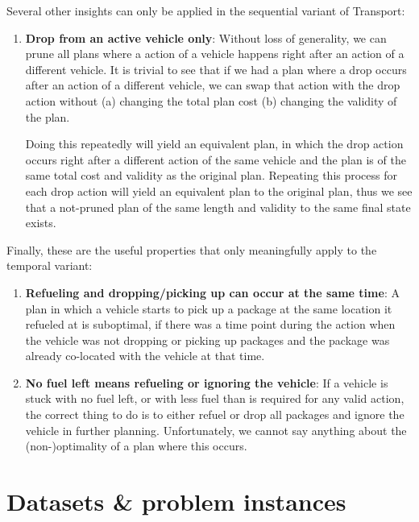 Several other insights can only be applied in the sequential variant of Transport:
\begin{enumerate}
\item \textbf{Drop from an active vehicle only}: Without loss of generality,
we can prune all plans where a \drop{} action of a vehicle happens
right after an action of a different vehicle. It is trivial to see that if we had a plan where a drop
occurs after an action of a different vehicle, we can swap that action with the drop
action without (a) changing the total plan cost (b) changing the validity of the plan.

Doing this repeatedly will yield an equivalent plan, in which the drop action
occurs right after a different action of the same vehicle and the plan is of the same total cost and validity as the original plan. Repeating this process for each drop action will yield an equivalent plan to the original plan, thus we see that a not-pruned plan of the same length and validity to the same final state exists.
\end{enumerate}
Finally, these are the useful properties that only meaningfully apply to the temporal variant:
\begin{enumerate}
\item \textbf{Refueling and dropping/picking up can occur at the same time}: 
A plan in which a vehicle starts to pick up a package at the same location it refueled at is suboptimal, if there was a time point during the  action
when the vehicle was not dropping or picking up packages and the package was already
co-located with the vehicle at that time.

\item \textbf{No fuel left means refueling or ignoring the vehicle}:
If a vehicle is stuck with no fuel left, or with less fuel than is required for
any valid \drive{} action, the correct thing to do is to either refuel or drop
all packages and ignore the vehicle in further planning. Unfortunately,
we cannot say anything about the (non-)optimality of a plan where this occurs.
\end{enumerate}
















\section{Datasets \& problem instances}\label{datasets}

